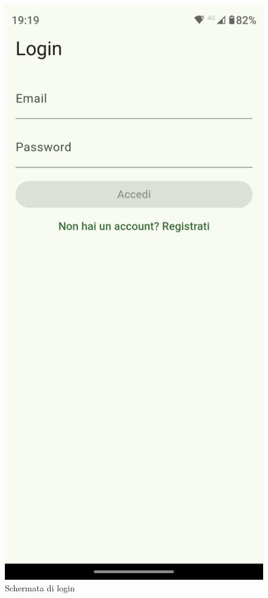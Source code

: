 \documentclass{article}
\begin{document}
\begin{figure}[H]
  \centering
  \includegraphics[width=0.6\linewidth]{login-f.png}
  \caption{Schermata di login}
  \label{fig:sitemap}
\end{figure}
\end{document}
